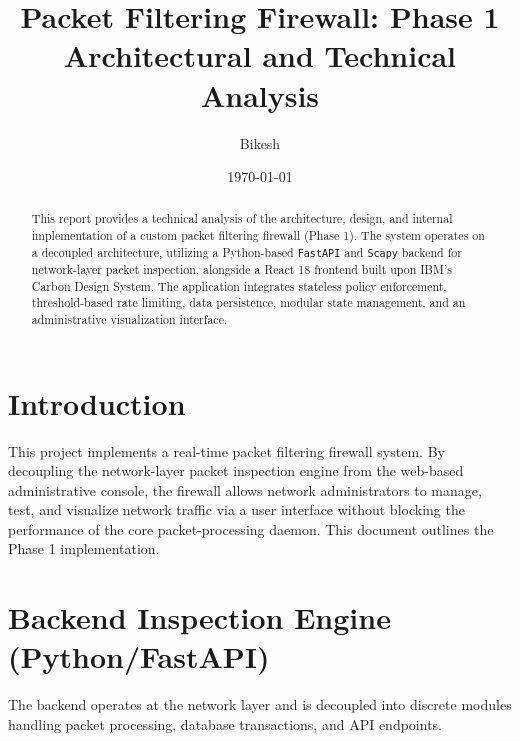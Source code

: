 \documentclass[12pt, a4paper]{article}
\title{\textbf{Packet Filtering Firewall: Phase 1 Architectural and Technical Analysis}}
\author{Bikesh}
\date{\today}
\begin{document}
\maketitle

\begin{abstract}
This report provides a technical analysis of the architecture, design, and internal implementation of a custom packet filtering firewall (Phase 1). The system operates on a decoupled architecture, utilizing a Python-based \texttt{FastAPI} and \texttt{Scapy} backend for network-layer packet inspection, alongside a React 18 frontend built upon IBM's Carbon Design System. The application integrates stateless policy enforcement, threshold-based rate limiting, data persistence, modular state management, and an administrative visualization interface.
\end{abstract}

\tableofcontents
\newpage

\section{Introduction}
This project implements a real-time packet filtering firewall system. By decoupling the network-layer packet inspection engine from the web-based administrative console, the firewall allows network administrators to manage, test, and visualize network traffic via a user interface without blocking the performance of the core packet-processing daemon. This document outlines the Phase 1 implementation.

\section{Backend Inspection Engine (Python/FastAPI)}
The backend operates at the network layer and is decoupled into discrete modules handling packet processing, database transactions, and API endpoints.
\end{document}
